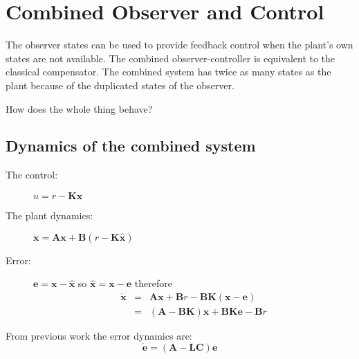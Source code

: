 \def\FileDate{10/04/02}
\def\FileVersion{1.0}


\section*{Combined Observer and Control} %
\label{sec:combined_observer_and_control}

The observer states can be used to provide feedback control when the plant’s own states are not available. The combined observer-controller is equivalent to the classical compensator. The combined system has twice as many states as the plant because of the duplicated states of the observer. 

How does the whole thing behave?

\subsection*{Dynamics of the combined system} %
\label{sub:dynamics_of_the_combined_system}


 
\begin{description}
	\item[The control:] $u=r-\mathbf{K}\hat{\mathbf{x}}$
	\item[The plant dynamics:] $\dot{\mathbf{x}}=\mathbf{A}\mathbf{x}+\mathbf{B}(r-\mathbf{K}\hat{\mathbf{x}})$
	\item[Error:] $\mathbf{e}=\mathbf{x}-\hat{\mathbf{x}}$ so $\hat{\mathbf{x}}=\mathbf{x}-\mathbf{e}$ therefore
	\begin{eqnarray*}
			\dot{\mathbf{x}} & = & \mathbf{A}\mathbf{x}+\mathbf{B}r-\mathbf{BK}(\mathbf{x}-\mathbf{e}) \\
			                 & = & (\mathbf{A}-\mathbf{BK})\mathbf{x}+\mathbf{BK}\mathbf{e}-\mathbf{B}r
	\end{eqnarray*}
\end{description}

From previous work the error dynamics are:
\[
\dot{\mathbf{e}} = (\mathbf{A}-\mathbf{LC})\mathbf{e}
\]


